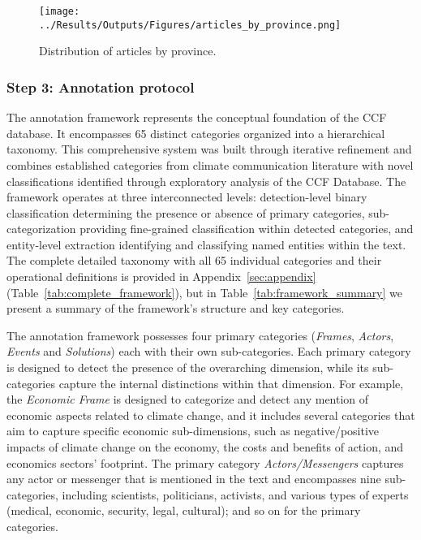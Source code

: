\documentclass[12pt]{article}
\begin{document}
\begin{figure}[!htbp]
  \centering
  \texttt{[image: ../Results/Outputs/Figures/articles\_by\_province.png]}
  \caption{Distribution of articles by province.}
  \label{fig:province_dist}
  \end{figure}

\subsubsection{Step 3: Annotation protocol}

The annotation framework represents the conceptual foundation of the CCF database. It encompasses 65 distinct categories organized into a hierarchical taxonomy. This comprehensive system was built through iterative refinement and combines established categories from climate communication literature with novel classifications identified through exploratory analysis of the CCF Database. The framework operates at three interconnected levels: detection-level binary classification determining the presence or absence of primary categories, sub-categorization providing fine-grained classification within detected categories, and entity-level extraction identifying and classifying named entities within the text. The complete detailed taxonomy with all 65 individual categories and their operational definitions is provided in Appendix~\ref{sec:appendix} (Table~\ref{tab:complete_framework}), but in Table~\ref{tab:framework_summary} we present a summary of the framework's structure and key categories.

The annotation framework possesses four primary categories (\emph{Frames}, \emph{Actors}, \emph{Events} and \emph{Solutions}) each with their own sub-categories. Each primary category is designed to detect the presence of the overarching dimension, while its sub-categories capture the internal distinctions within that dimension. For example, the \emph{Economic Frame} is designed to categorize and detect any mention of economic aspects related to climate change, and it includes several categories that aim to capture specific economic sub-dimensions, such as negative/positive impacts of climate change on the economy, the costs and benefits of action, and economics sectors' footprint. The primary category \emph{Actors/Messengers} captures any actor or messenger that is mentioned in the text and encompasses nine sub-categories, including scientists, politicians, activists, and various types of experts (medical, economic, security, legal, cultural); and so on for the primary categories. 
\end{document}

